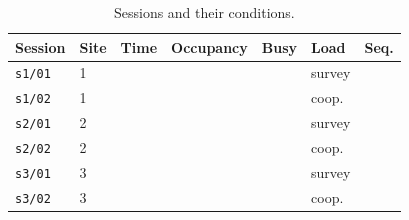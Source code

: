 \begin{table}[t]
\centering
\caption{Sessions and their conditions.}
\label{tab:sessions}
\footnotesize
\setlength{\tabcolsep}{3pt}
\begin{tabular}{@{}lllllll@{}}
\toprule
Session & Site & Time & Occupancy & Busy & Load & Seq. \\
\midrule
\texttt{s1/01} & 1 & \todo{} & \todo{} & \todo{} & survey & \todo{} \\
\texttt{s1/02} & 1 & \todo{} & \todo{} & \todo{} & coop.  & \todo{} \\
\texttt{s2/01} & 2 & \todo{} & \todo{} & \todo{} & survey & \todo{} \\
\texttt{s2/02} & 2 & \todo{} & \todo{} & \todo{} & coop.  & \todo{} \\
\texttt{s3/01} & 3 & \todo{} & \todo{} & \todo{} & survey & \todo{} \\
\texttt{s3/02} & 3 & \todo{} & \todo{} & \todo{} & coop.  & \todo{} \\
\bottomrule
\end{tabular}
\end{table}
